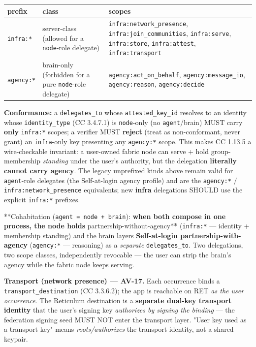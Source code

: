 \documentclass[11pt]{article}
\begin{document}
{\footnotesize
\begin{longtable}{|p{5.33cm}|p{5.33cm}|p{5.33cm}|}\hline
\textbf{prefix} & \textbf{class} & \textbf{scopes} \\ \hline\endhead
\texttt{infra:*} & server-class (allowed for a \texttt{node}-role delegate) & \texttt{infra:network\_presence}, \texttt{infra:join\_communities}, \texttt{infra:serve}, \texttt{infra:store}, \texttt{infra:attest}, \texttt{infra:transport} \\ \hline
\texttt{agency:*} & brain-only (forbidden for a pure \texttt{node}-role delegate) & \texttt{agency:act\_on\_behalf}, \texttt{agency:message\_io}, \texttt{agency:reason}, \texttt{agency:decide} \\ \hline
\end{longtable}}


\textbf{Conformance:} a \texttt{delegates\_to} whose \texttt{attested\_key\_id} resolves to an identity whose \texttt{identity\_type} (CC 3.4.7.1) is \texttt{node}-only (no \texttt{agent}/brain) MUST carry \textbf{only} \texttt{infra:*} scopes; a verifier MUST \textbf{reject} (treat as non-conformant, never grant) an \texttt{infra}-only key presenting any \texttt{agency:*} scope. This makes CC 1.13.5 a wire-checkable invariant: a user-owned fabric node can serve + hold group-membership \textit{standing} under the user's authority, but the delegation \textbf{literally cannot carry agency}. The legacy unprefixed kinds above remain valid for \texttt{agent}-role delegates (the Self-at-login agency profile) and are the \texttt{agency:*} / \texttt{infra:network\_presence} equivalents; new \textbf{infra} delegations SHOULD use the explicit \texttt{infra:*} prefixes.


**Cohabitation (\texttt{agent = node + brain}):\textbf{ when both compose in one process, the node holds }partnership-without-agency** (\texttt{infra:*} — identity + membership standing) and the brain layers \textbf{Self-at-login partnership-with-agency} (\texttt{agency:*} — reasoning) as a \textit{separate} \texttt{delegates\_to}. Two delegations, two scope classes, independently revocable — the user can strip the brain's agency while the fabric node keeps serving.


\textbf{Transport (network presence) — AV-17.} Each occurrence binds a \texttt{transport\_destination} (CC 3.3.6.2); the app is reachable on RET \textit{as the user occurrence}. The Reticulum destination is a \textbf{separate dual-key transport identity} that the user's signing key \textit{authorizes by signing the binding} — the federation signing seed MUST NOT enter the transport layer. "User key used as a transport key" means \textit{roots/authorizes} the transport identity, not a shared keypair.
\end{document}
